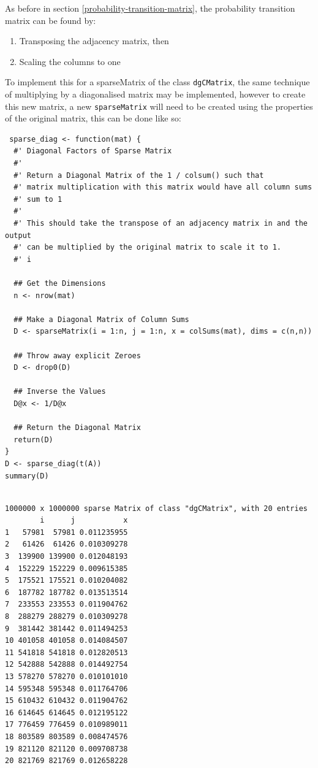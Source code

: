 \documentclass[11pt]{article}
\begin{document}
As before in section \ref{probability-transition-matrix}, the probability transition matrix can be found by:

\begin{enumerate}
\item Transposing the adjacency matrix, then
\item Scaling the columns to one
\end{enumerate}

To implement this for a sparseMatrix of the class \texttt{dgCMatrix}, the same technique of multiplying by a diagonalised matrix may be implemented, however to create this new matrix, a new \texttt{sparseMatrix} will need to be created using the properties of the original matrix, this can be done like so:


\lstset{language=r,label= ,caption= ,captionpos=b,numbers=none}
\begin{lstlisting}
 sparse_diag <- function(mat) {
  #' Diagonal Factors of Sparse Matrix
  #'
  #' Return a Diagonal Matrix of the 1 / colsum() such that
  #' matrix multiplication with this matrix would have all column sums
  #' sum to 1
  #'
  #' This should take the transpose of an adjacency matrix in and the output
  #' can be multiplied by the original matrix to scale it to 1.
  #' i

  ## Get the Dimensions
  n <- nrow(mat)

  ## Make a Diagonal Matrix of Column Sums
  D <- sparseMatrix(i = 1:n, j = 1:n, x = colSums(mat), dims = c(n,n))

  ## Throw away explicit Zeroes
  D <- drop0(D)

  ## Inverse the Values
  D@x <- 1/D@x

  ## Return the Diagonal Matrix
  return(D)
}
D <- sparse_diag(t(A))
summary(D)
\end{lstlisting}

\begin{verbatim}

1000000 x 1000000 sparse Matrix of class "dgCMatrix", with 20 entries
        i      j           x
1   57981  57981 0.011235955
2   61426  61426 0.010309278
3  139900 139900 0.012048193
4  152229 152229 0.009615385
5  175521 175521 0.010204082
6  187782 187782 0.013513514
7  233553 233553 0.011904762
8  288279 288279 0.010309278
9  381442 381442 0.011494253
10 401058 401058 0.014084507
11 541818 541818 0.012820513
12 542888 542888 0.014492754
13 578270 578270 0.010101010
14 595348 595348 0.011764706
15 610432 610432 0.011904762
16 614645 614645 0.012195122
17 776459 776459 0.010989011
18 803589 803589 0.008474576
19 821120 821120 0.009708738
20 821769 821769 0.012658228
\end{verbatim}
\end{document}
